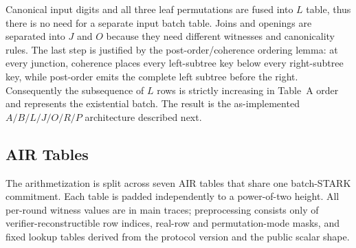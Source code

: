 \documentclass[twocolumn]{article}
\begin{document}
Canonical input digits and all three leaf permutations are fused into $L$ table, thus there is no need for a separate input batch table. Joins and openings are separated into $J$ and $O$ because they need different witnesses and canonicality rules. The last step is justified by the post-order/coherence ordering lemma: at every junction, coherence places every left-subtree key below every right-subtree key, while post-order emits the complete left subtree before the right. Consequently the subsequence of $L$ rows is strictly increasing in Table~A order and represents the existential batch. The result is the as-implemented $A/B/L/J/O/R/P$ architecture described next.

\subsection{AIR Tables}

The arithmetization is split across seven AIR tables that share one batch-STARK commitment. Each table is padded independently to a power-of-two height. All per-round witness values are in main traces; preprocessing consists only of verifier-reconstructible row indices, real-row and permutation-mode masks, and fixed lookup tables derived from the protocol version and the public scalar shape.
\end{document}
